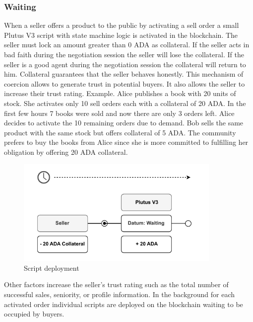 \documentclass[12pt]{article}
\begin{document}
\subsubsection { Waiting }

When a seller offers a product to the public by activating a sell order a small Plutus V3 script with state machine logic is activated in the blockchain.
The seller must lock an amount greater than 0 ADA as collateral. 
If the seller acts in bad faith during the negotiation session the seller will lose the collateral.
If the seller is a good agent during the negotiation session the collateral will return to him.
Collateral guarantees that the seller behaves honestly.
This mechanism of coercion allows to generate trust in potential buyers. 
It also allows the seller to increase their trust rating. Example. Alice publishes a book with 20 units of stock.
She activates only 10 sell orders each with a collateral of 20 ADA.
In the first few hours 7 books were sold and now there are only 3 orders left.
Alice decides to activate the 10 remaining orders due to demand.
Bob sells the same product with the same stock but offers collateral of 5 ADA. The community prefers to buy the books from Alice since she is more committed to fulfilling her obligation by offering 20 ADA collateral.

\begin{figure}[ht]
  \centering
  \includegraphics[width=0.88\textwidth, keepaspectratio]{1.pdf}
  \caption{Script deployment}
  \label{fig:mi_imagen}
\end{figure}
Other factors increase the seller's trust rating such as the total number of successful sales, seniority, or profile information.
In the background for each activated order individual scripts are deployed on the blockchain waiting to be occupied by buyers.
\\
\\
\\
\end{document}
